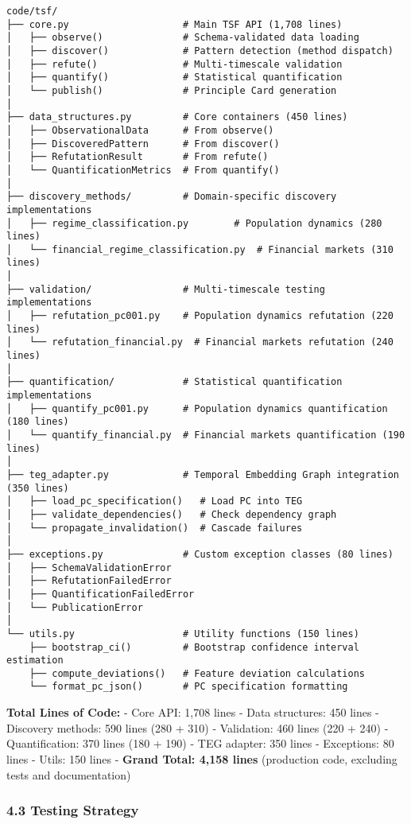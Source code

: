 \documentclass[
]{article}
\begin{document}
\begin{verbatim}
code/tsf/
├── core.py                    # Main TSF API (1,708 lines)
│   ├── observe()              # Schema-validated data loading
│   ├── discover()             # Pattern detection (method dispatch)
│   ├── refute()               # Multi-timescale validation
│   ├── quantify()             # Statistical quantification
│   └── publish()              # Principle Card generation
│
├── data_structures.py         # Core containers (450 lines)
│   ├── ObservationalData      # From observe()
│   ├── DiscoveredPattern      # From discover()
│   ├── RefutationResult       # From refute()
│   └── QuantificationMetrics  # From quantify()
│
├── discovery_methods/         # Domain-specific discovery implementations
│   ├── regime_classification.py        # Population dynamics (280 lines)
│   └── financial_regime_classification.py  # Financial markets (310 lines)
│
├── validation/                # Multi-timescale testing implementations
│   ├── refutation_pc001.py    # Population dynamics refutation (220 lines)
│   └── refutation_financial.py  # Financial markets refutation (240 lines)
│
├── quantification/            # Statistical quantification implementations
│   ├── quantify_pc001.py      # Population dynamics quantification (180 lines)
│   └── quantify_financial.py  # Financial markets quantification (190 lines)
│
├── teg_adapter.py             # Temporal Embedding Graph integration (350 lines)
│   ├── load_pc_specification()   # Load PC into TEG
│   ├── validate_dependencies()   # Check dependency graph
│   └── propagate_invalidation()  # Cascade failures
│
├── exceptions.py              # Custom exception classes (80 lines)
│   ├── SchemaValidationError
│   ├── RefutationFailedError
│   ├── QuantificationFailedError
│   └── PublicationError
│
└── utils.py                   # Utility functions (150 lines)
    ├── bootstrap_ci()         # Bootstrap confidence interval estimation
    ├── compute_deviations()   # Feature deviation calculations
    └── format_pc_json()       # PC specification formatting
\end{verbatim}

\textbf{Total Lines of Code:} - Core API: 1,708 lines - Data structures:
450 lines - Discovery methods: 590 lines (280 + 310) - Validation: 460
lines (220 + 240) - Quantification: 370 lines (180 + 190) - TEG adapter:
350 lines - Exceptions: 80 lines - Utils: 150 lines - \textbf{Grand
Total: 4,158 lines} (production code, excluding tests and documentation)

\subsubsection{4.3 Testing Strategy}\label{testing-strategy}
\end{document}
